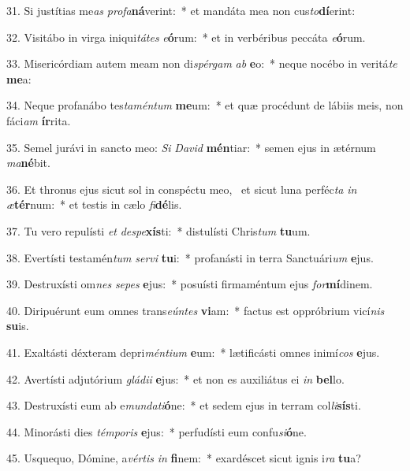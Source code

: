 31. Si justítias me\textit{as} \textit{pro}\textit{fa}\textbf{ná}verint:~*  et mandáta mea non cus\textit{to}\textbf{dí}erint:\

32. Visitábo in virga iniqui\textit{tá}\textit{tes} \textit{e}\textbf{ó}rum:~*  et in verbéribus peccáta \textit{e}\textbf{ó}rum.\

33. Misericórdiam autem meam non di\textit{spér}\textit{gam} \textit{ab} \textbf{e}o:~*  neque nocébo in veritá\textit{te} \textbf{me}a:\

34. Neque profanábo tes\textit{ta}\textit{mén}\textit{tum} \textbf{me}um:~*  et quæ procédunt de lábiis meis, non fáci\textit{am} \textbf{ír}rita.\

35. Semel jurávi in sancto meo: \textit{Si} \textit{Da}\textit{vid} \textbf{mén}tiar:~*  semen ejus in ætérnum \textit{ma}\textbf{né}bit.\

36. Et thronus ejus sicut sol in conspéctu meo, \dag\  et sicut luna perféc\textit{ta} \textit{in} \textit{æ}\textbf{tér}num:~*  et testis in cælo \textit{fi}\textbf{dé}lis.\

37. Tu vero repulísti \textit{et} \textit{de}\textit{spe}\textbf{xís}ti:~*  distulísti Chris\textit{tum} \textbf{tu}um.\

38. Evertísti testamén\textit{tum} \textit{ser}\textit{vi} \textbf{tu}i:~*  profanásti in terra Sanctuári\textit{um} \textbf{e}jus.\

39. Destruxísti om\textit{nes} \textit{se}\textit{pes} \textbf{e}jus:~*  posuísti firmaméntum ejus \textit{for}\textbf{mí}dinem.\

40. Diripuérunt eum omnes trans\textit{e}\textit{ún}\textit{tes} \textbf{vi}am:~*  factus est oppróbrium vicí\textit{nis} \textbf{su}is.\

41. Exaltásti déxteram depri\textit{mén}\textit{ti}\textit{um} \textbf{e}um:~*  lætificásti omnes inimí\textit{cos} \textbf{e}jus.\

42. Avertísti adjutórium \textit{glá}\textit{di}\textit{i} \textbf{e}jus:~*  et non es auxiliátus ei \textit{in} \textbf{bel}lo.\

43. Destruxísti eum ab e\textit{mun}\textit{da}\textit{ti}\textbf{ó}ne:~*  et sedem ejus in terram col\textit{li}\textbf{sís}ti.\

44. Minorásti dies \textit{tém}\textit{po}\textit{ris} \textbf{e}jus:~*  perfudísti eum confu\textit{si}\textbf{ó}ne.\

45. Usquequo, Dómine, a\textit{vér}\textit{tis} \textit{in} \textbf{fi}nem:~*  exardéscet sicut ignis i\textit{ra} \textbf{tu}a?\

